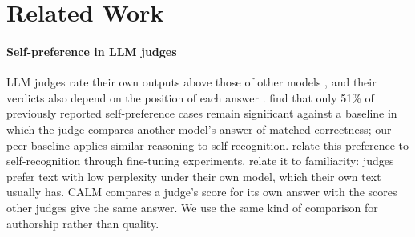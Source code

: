 \section{Related Work}
\label{sec:related}

\paragraph{Self-preference in LLM judges}
LLM judges rate their own outputs above those of other models
\citep{panickssery2024selfpreference, wataoka2024perplexity, ye2025justice},
and their verdicts also depend on the position of each answer
\citep{shi2025positionbias}. \citet{roytburg2026narcissists} find that only
51\% of previously reported self-preference cases remain significant against a
baseline in which the judge compares another model's answer of matched
correctness; our peer baseline applies similar reasoning to self-recognition.
\citet{panickssery2024selfpreference} relate this preference to
self-recognition through fine-tuning experiments.
\citet{wataoka2024perplexity} relate it to familiarity: judges prefer text with
low perplexity under their own model, which their own text usually has. CALM
\citep{ye2025justice} compares a judge's score for its own answer with the
scores other judges give the same answer. We use the same kind of comparison
for authorship rather than quality.

